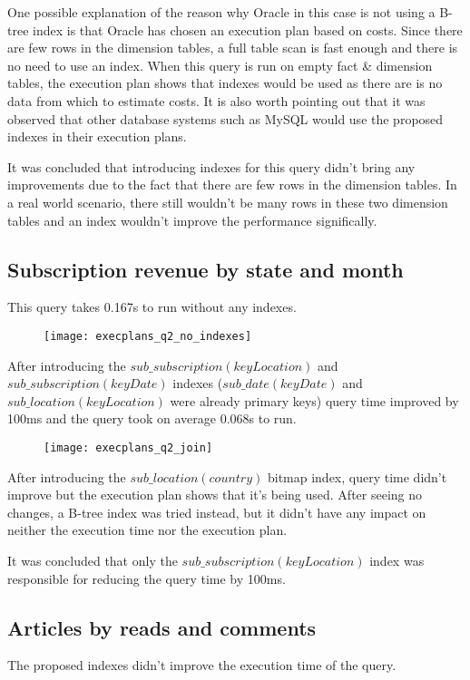 One possible explanation of the reason why Oracle in this case is not using a B-tree index is that Oracle has chosen an execution plan based on costs. Since there are few rows in the dimension tables, a full table scan is fast enough and there is no need to use an index. When this query is run on empty fact \& dimension tables, the execution plan shows that indexes would be used as there are is no data from which to estimate costs. It is also worth pointing out that it was observed that other database systems such as MySQL would use the proposed indexes in their execution plans.

It was concluded that introducing indexes for this query didn't bring any improvements due to the fact that there are few rows in the dimension tables. In a real world scenario, there still wouldn't be many rows in these two dimension tables and an index wouldn't improve the performance significally.

\subsection*{Subscription revenue by state and month} 
This query takes 0.167s to run without any indexes.

\begin{figure}[!htp]
\begin{center}
  \texttt{[image: execplans\_q2\_no\_indexes]}
\end{center}
\end{figure}

After introducing the $sub\_subscription(keyLocation)$ and $sub\_subscription(keyDate)$ indexes ($sub\_date(keyDate)$ and $sub\_location(keyLocation)$ were already primary keys) query time improved by 100ms and the query took on average 0.068s to run.

\begin{figure}[!htp]
\begin{center}
  \texttt{[image: execplans\_q2\_join]}
\end{center}
\end{figure}

After introducing the $sub\_location(country)$ bitmap index, query time didn't improve but the execution plan shows that it's being used. After seeing no changes, a B-tree index was tried instead, but it didn't have any impact on neither the execution time nor the execution plan.

It was concluded that only the $sub\_subscription(keyLocation)$ index was responsible for reducing the query time by 100ms.

\subsection*{Articles by reads and comments}

The proposed indexes didn't improve the execution time of the query.